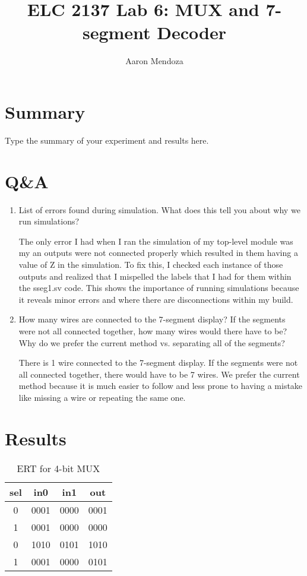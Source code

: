 \documentclass[11pt]{article}
\begin{document}
\title{ELC 2137 Lab 6: MUX and 7-segment Decoder}
\author{Aaron Mendoza}

\maketitle


\section*{Summary}

Type the summary of your experiment and results here.  


\section*{Q\&A}

\begin{enumerate}
	\item List of errors found during simulation. What does this tell you about why we run simulations?
	
	The only error I had when I ran the simulation of my top-level module was my an outputs were not connected properly which resulted in them having a value of Z in the simulation. To fix this, I checked each instance of those outputs and realized that I mispelled the labels that I had for them within the sseg1.sv code.
	This shows the importance of running simulations because it reveals minor errors and where there are disconnections within my build.
	
	\item How many wires are connected to the 7-segment display? If the segments were not all connected together, how many wires would there have to be? Why do we prefer the current method vs. separating all of the segments?
	
	There is 1 wire connected to the 7-segment display. If the segments were not all connected together, there would have to be 7 wires. We prefer the current method because it is much easier to follow and less prone to having a mistake like missing a wire or repeating the same one.
	
\end{enumerate}


\section*{Results}

\begin{table}[ht]\centering
	\caption{ERT for 4-bit MUX}
	\label{tbl:example_table}
	\begin{tabular}{ccc|c}
		\toprule
		sel & in0 & in1 & out \\
		\midrule
		0 & 0001 & 0000 & 0001 \\
		1 & 0001 & 0000 & 0000 \\
		0 & 1010 & 0101 & 1010 \\
		1 & 0001 & 0000 & 0101 \\
		\bottomrule
	\end{tabular} 
\end{table}
\end{document}
